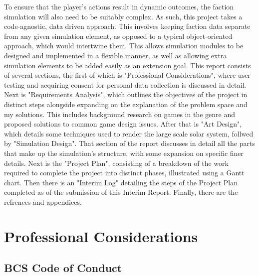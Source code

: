 \documentclass{report}
\begin{document}
To ensure that the player's actions result in dynamic outcomes, the faction simulation will also need to be suitably complex. As such, this project takes a code-agnostic, data driven approach. This involves keeping faction data separate from any given simulation element, as opposed to a typical object-oriented approach, which would intertwine them. This allows simulation modules to be designed and implemented in a flexible manner, as well as allowing extra simulation elements to be added easily as an extension goal.
\newline
\newline
{}
This report consists of several sections, the first of which is "Professional Considerations", where user testing and acquiring consent for personal data collection is discussed in detail. Next is "Requirements Analysis", which outlines the objectives of the project in distinct steps alongside expanding on the explanation of the problem space and my solutions. This includes background research on games in the genre and proposed solutions to common game design issues. After that is "Art Design", which details some techniques used to render the large scale solar system, follwed by "Simulation Design". That section of the report discusses in detail all the parts that make up the simulation's structure, with some expansion on specific finer details.
Next is the "Project Plan", consisting of a breakdown of the work required to complete the project into distinct phases, illustrated using a Gantt chart. Then there is an "Interim Log" detailing the steps of the Project Plan completed as of the submission of this Interim Report. Finally, there are the refrences and appendices.

\chapter{Professional Considerations}

\section{BCS Code of Conduct}
\end{document}
